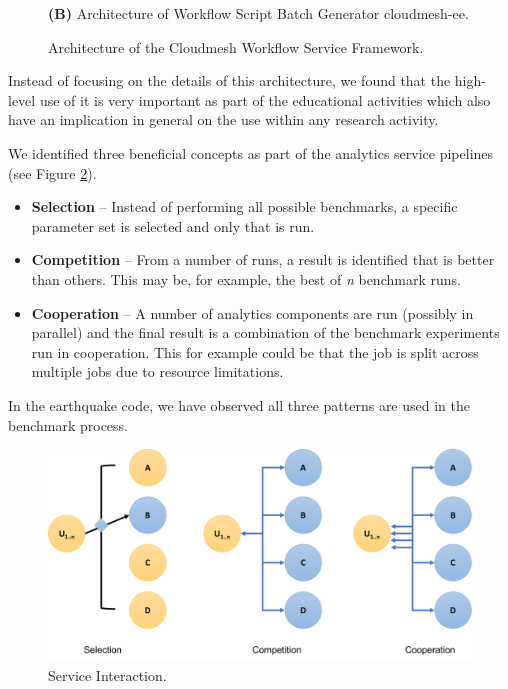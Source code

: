 \documentclass[utf8]{FrontiersinVancouver} %
\begin{document}
\begin{figure}[htb]
{    
    {\bf (B)} Architecture of Workflow Script Batch Generator cloudmesh-ee.
  }

  
  
    \caption{Architecture of the Cloudmesh Workflow Service Framework.}
    \label{fig:cc-2}

\end{figure}





Instead of focusing on the details of this architecture, we found that the high-level use of it is very important as part of the educational activities which also have an implication in general on the use within any research activity.

We identified three beneficial concepts as part of the analytics service pipelines (see Figure \ref{fig:service-interaction}).

\begin{itemize}
\item {\bf Selection} -- Instead of performing all possible benchmarks,  a specific parameter set is selected and only that is run.  \item {\bf Competition} -- From a number of runs, a result is identified that is better than others. This may be, for example, the best of {\em n} benchmark runs.
\item {\bf Cooperation} -- A number of analytics components are run  (possibly in parallel) and the final result is a combination of the benchmark experiments run in cooperation. This for example could be that the job is split across multiple jobs due to resource limitations.
\end{itemize}

In the earthquake code, we have observed all three patterns are used in the benchmark process.

\begin{figure}[htb]
\centering\includegraphics[width=0.75\columnwidth]{images/processes-nist}
\caption{Service Interaction.}
\label{fig:service-interaction}
\end{figure}
\end{document}
